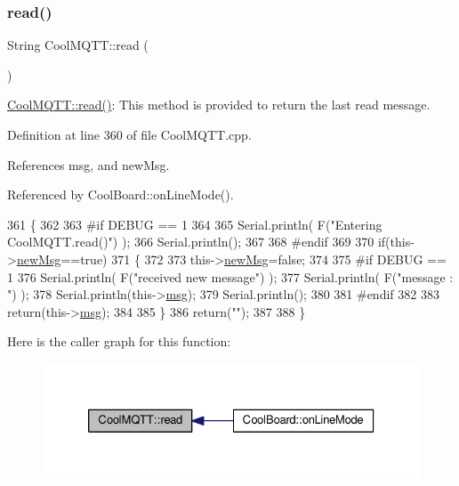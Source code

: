 \subsubsection{\texorpdfstring{read()}{read()}}
{\footnotesize\ttfamily String Cool\+M\+Q\+T\+T\+::read (\begin{DoxyParamCaption}{ }\end{DoxyParamCaption})}

\hyperlink{classCoolMQTT_ae3c18f6ae9723746d32765f1c8f176ca}{Cool\+M\+Q\+T\+T\+::read()}\+: This method is provided to return the last read message. 

Definition at line 360 of file Cool\+M\+Q\+T\+T.\+cpp.



References msg, and new\+Msg.



Referenced by Cool\+Board\+::on\+Line\+Mode().


\begin{DoxyCode}
361 \{   
362 
363 \textcolor{preprocessor}{#if DEBUG == 1 }
364 
365     Serial.println( F(\textcolor{stringliteral}{"Entering CoolMQTT.read()"}) );
366     Serial.println();
367 
368 \textcolor{preprocessor}{#endif }
369 
370     \textcolor{keywordflow}{if}(this->\hyperlink{classCoolMQTT_a3240388137b885775aadf38e96b24c6b}{newMsg}==\textcolor{keyword}{true})
371     \{
372         
373         this->\hyperlink{classCoolMQTT_a3240388137b885775aadf38e96b24c6b}{newMsg}=\textcolor{keyword}{false};
374 
375 \textcolor{preprocessor}{#if DEBUG == 1 }
376         Serial.println( F(\textcolor{stringliteral}{"received new message"}) );
377         Serial.println( F(\textcolor{stringliteral}{"message : "}) );
378         Serial.println(this->\hyperlink{classCoolMQTT_af6b19e7074dbbb4ae493c44dcb53f7ff}{msg});
379         Serial.println();
380 
381 \textcolor{preprocessor}{#endif}
382 
383         \textcolor{keywordflow}{return}(this->\hyperlink{classCoolMQTT_af6b19e7074dbbb4ae493c44dcb53f7ff}{msg});
384         
385     \}
386     \textcolor{keywordflow}{return}(\textcolor{stringliteral}{""});
387 
388 \}
\end{DoxyCode}
Here is the caller graph for this function\+:\nopagebreak
\begin{figure}[H]
\begin{center}
\leavevmode
\includegraphics[width=326pt]{classCoolMQTT_ae3c18f6ae9723746d32765f1c8f176ca_icgraph}
\end{center}
\end{figure}
\mbox{\label{classCoolMQTT_a5d003307eff78efbd585e42b43b72b6d}} 
